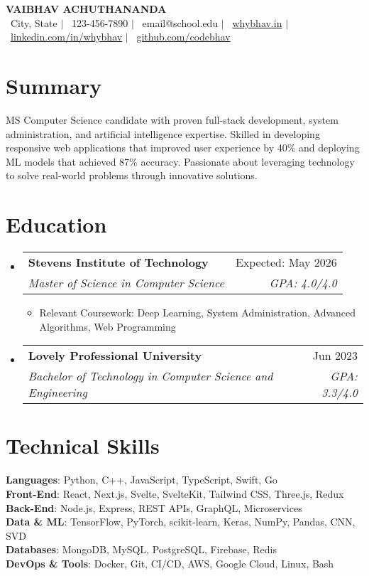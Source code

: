 \documentclass[letterpaper,11pt]{article}
\makeatletter
\newcommand{\resumeItem}[1]{
  \item\small{
    {#1 \vspace{-1pt}}
  }
}
\newcommand{\resumeSubheading}[4]{
  \vspace{-2pt}\item
    \begin{tabular*}{\textwidth}[t]{l@{\extracolsep{\fill}}r}
      \textbf{#1} & #2 \\
      \textit{\small#3} & \textit{\small #4} \\
    \end{tabular*}\vspace{-7pt}
}
\newcommand{\resumeSubHeadingListStart}{\begin{itemize}[leftmargin=0in, label={}]}
\newcommand{\resumeSubHeadingListEnd}{\end{itemize}}
\newcommand{\resumeItemListStart}{\begin{itemize}}
\newcommand{\resumeItemListEnd}{\end{itemize}\vspace{-5pt}}
\makeatother
\begin{document}
\begin{center}
    \textbf{\Huge \color{mitred}VAIBHAV ACHUTHANANDA} \\ \vspace{3pt}
    \small 
    \faMapMarker*\ City, State $|$ 
    \faMobile*\ 123-456-7890 $|$ 
    \faEnvelope\ email@school.edu $|$ 
    \faGlobe\ \href{https://whybhav.in/}{whybhav.in} $|$
    \faLinkedin\ \href{https://www.linkedin.com/in/whybhav}{linkedin.com/in/whybhav} $|$
    \faGithub\ \href{https://github.com/codebhav}{github.com/codebhav}
\end{center}

\section{Summary}
\small{
MS Computer Science candidate with proven full-stack development, system administration, and artificial intelligence expertise. Skilled in developing responsive web applications that improved user experience by 40\% and deploying ML models that achieved 87\%
accuracy. Passionate about leveraging technology to solve real-world problems through innovative solutions.
}

\section{Education}
  \resumeSubHeadingListStart
    \resumeSubheading
      {Stevens Institute of Technology}{Expected: May 2026}
      {Master of Science in Computer Science}{GPA: 4.0/4.0}
      \resumeItemListStart
        \resumeItem{Relevant Coursework: Deep Learning, System Administration, Advanced Algorithms, Web Programming}
      \resumeItemListEnd
      
    \resumeSubheading
      {Lovely Professional University}{Jun 2023}
      {Bachelor of Technology in Computer Science and Engineering}{GPA: 3.3/4.0}
  \resumeSubHeadingListEnd

\section{Technical Skills}
  \begin{itemize}[leftmargin=0in, label={}]
    \small{\item{
      \textbf{Languages}{: Python, C++, JavaScript, TypeScript, Swift, Go} \\
      \textbf{Front-End}{: React, Next.js, Svelte, SvelteKit, Tailwind CSS, Three.js, Redux} \\
      \textbf{Back-End}{: Node.js, Express, REST APIs, GraphQL, Microservices} \\
      \textbf{Data \& ML}{: TensorFlow, PyTorch, scikit-learn, Keras, NumPy, Pandas, CNN, SVD} \\
      \textbf{Databases}{: MongoDB, MySQL, PostgreSQL, Firebase, Redis} \\
      \textbf{DevOps \& Tools}{: Docker, Git, CI/CD, AWS, Google Cloud, Linux, Bash} \\
    }}
  \end{itemize}
\end{document}
